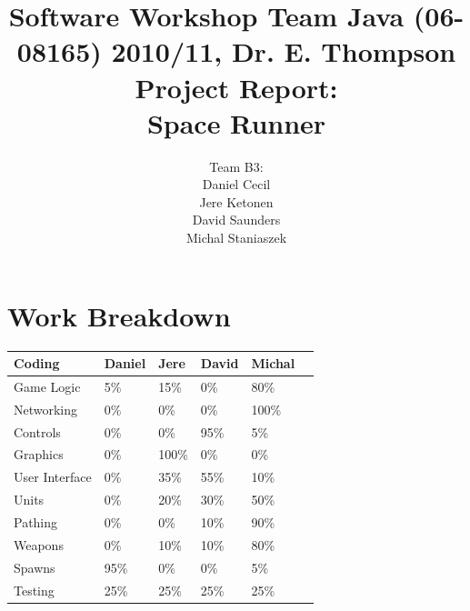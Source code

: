 \documentclass[10pt]{report}
\title{
{\normalsize Software Workshop Team Java (06-08165) 2010/11, Dr. E. Thompson}\\[2cm]
Project Report:\\
Space Runner
}
\author{Team B3:\\
Daniel Cecil\\
Jere Ketonen\\
David Saunders\\
Michal Staniaszek
}
\begin{document}
\maketitle
\tableofcontents
\chapter*{Work Breakdown}
\label{work-breakdown}

\thispagestyle{empty}

\begin{center}
  \begin{tabular}{|l||l|l|l|l|l|}\hline
    \textbf{Coding} & \textbf{Daniel} & \textbf{Jere} & \textbf{David}
    & \textbf{Michal} \\\hline\hline
    Game Logic &  5\% & 15\% & 0\% & 80\%\\\hline
    Networking &  0\% & 0\% & 0\% & 100\%\\\hline
    Controls &  0\% & 0\% & 95\% & 5\%\\\hline
    Graphics &  0\% & 100\% & 0\% & 0\%\\\hline
    User Interface &  0\% & 35\% & 55\% & 10\%\\\hline
    Units &  0\% & 20\% & 30\% & 50\%\\\hline
    Pathing &  0\% & 0\% & 10\% & 90\%\\\hline
    Weapons &  0\% & 10\% & 10\% & 80\%\\\hline
    Spawns &  95\% & 0\% & 0\% & 5\%\\\hline
    Testing & 25\% & 25\% & 25\% & 25\%\\\hline
  \end{tabular}\vspace*{1cm}


\end{center}
\end{document}
